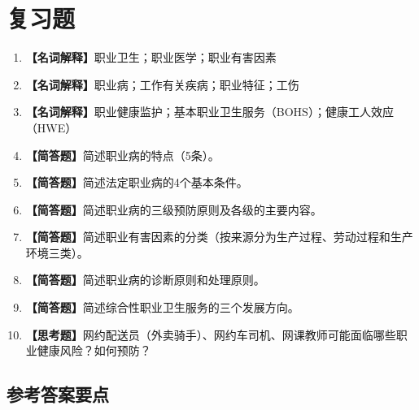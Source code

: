 \section{复习题}

\begin{enumerate}[leftmargin=*, itemsep=8pt]
    \item \textbf{【名词解释】}职业卫生；职业医学；职业有害因素
    \item \textbf{【名词解释】}职业病；工作有关疾病；职业特征；工伤
    \item \textbf{【名词解释】}职业健康监护；基本职业卫生服务（BOHS）；健康工人效应（HWE）
    \item \textbf{【简答题】}简述职业病的特点（5条）。
    \item \textbf{【简答题】}简述法定职业病的4个基本条件。
    \item \textbf{【简答题】}简述职业病的三级预防原则及各级的主要内容。
    \item \textbf{【简答题】}简述职业有害因素的分类（按来源分为生产过程、劳动过程和生产环境三类）。
    \item \textbf{【简答题】}简述职业病的诊断原则和处理原则。
    \item \textbf{【简答题】}简述综合性职业卫生服务的三个发展方向。
    \item \textbf{【思考题】}网约配送员（外卖骑手）、网约车司机、网课教师可能面临哪些职业健康风险？如何预防？
\end{enumerate}

\subsection*{参考答案要点}

